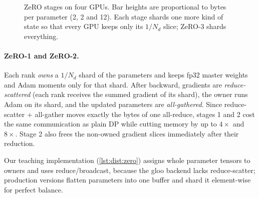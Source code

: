 \begin{figure}[t]
\centering
{}
\caption{ZeRO stages on four GPUs. Bar heights are proportional to bytes per parameter (2, 2
and 12). Each stage shards one more kind of state so that every GPU keeps only its $1/N_d$
slice; ZeRO-3 shards everything.}
\label{fig:dist:zero}
\end{figure}

\paragraph{ZeRO-1 and ZeRO-2.} Each rank \emph{owns} a $1/N_d$ shard of the parameters and keeps
fp32 master weights and Adam moments only for that shard. After backward, gradients are
\emph{reduce-scattered} (each rank receives the summed gradient of its shard), the owner runs
Adam on its shard, and the updated parameters are \emph{all-gathered}. Since reduce-scatter +
all-gather moves exactly the bytes of one all-reduce, stages 1 and 2 cost the same
communication as plain DP while cutting memory by up to $4\times$ and $8\times$. Stage 2 also
frees the non-owned gradient slices immediately after their reduction.

Our teaching implementation (\cref{lst:dist:zero}) assigns whole parameter tensors to owners
and uses reduce/broadcast, because the gloo backend lacks reduce-scatter; production versions
flatten parameters into one buffer and shard it element-wise for perfect balance.

